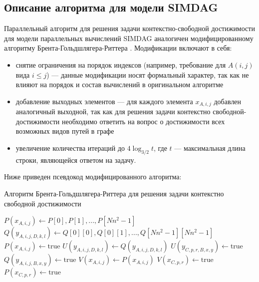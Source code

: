 \documentclass{spbau-diploma}
\begin{document}
\subsection {Описание алгоритма для модели SIMDAG}
Параллельный алгоритм для решения задачи контекстно-свободной достижимости  для модели параллельных вычислений SIMDAG аналогичен модифицированному алгоритму Брента-Гольдшлягера-Риттера \cite{Brent}. Модификации включают в себя:
\begin{itemize} 
  \item снятие ограничения на порядок индексов (например, требование для $A(i, j)$ вида $i \leq j$) --- данные модификации носят формальный характер, так как не влияют на порядок и состав вычислений в оригинальном алгоритме
  \item добавление выходных элементов --- для каждого элемента $x_{A, i, j}$ добавлен аналогичный выходной, так как для решения задачи контекстно свободной-достижимости необходимо ответить на вопрос о достижимости всех возможных видов путей в графе
\item увеличение количества итераций до $4\log_{3/2}t$, где $t$ --- максимальная длина строки, являющейся ответом на задачу.
\end{itemize}
Ниже приведен псевдокод модифицированного алгоритма:
\begin{algorithm}
\caption{Алгоритм Брента-Гольдшлягера-Риттера для решения задачи контекстно свободной достижимости}\label{euclid}
\begin{algorithmic}[1]
\State $\textit{$P(x_{A, i, j})$} \gets \textit{$P[0], P[1], ... , P[Nn^2 - 1]$}$
\State $\textit{$Q(y_{A,i,j,D,k,l})$} \gets \textit{$Q[0][0], Q[0][1], ... , Q[Nn^2 - 1] [Nn^2 - 1]$}$
\State $P(x_{A, i, j})  \gets \text{true}$
\EndIf
{}
\State  $\textit{$U(y_{A,i,j,D,k,l})$} \gets \textit{$Q(y_{A,i,j,D,k,l})$}$
\State $U(y_{C,p,r,B,x,y}) \gets \text{true}$
\EndIf
{}
\State $Q(y_{A,i,j,B,x,y}) \gets \text{true}$
\EndIf
\State $V(x_{A, i, j})  \gets P(x_{A, i, j})$
\State $V(x_{C, p, r}) \gets \text{true}$
\EndIf
{}
\State $P(x_{C, p, r}) \gets \text{true}$
\EndIf
 \EndFor
\end{algorithmic}
\end{algorithm}
\end{document}
